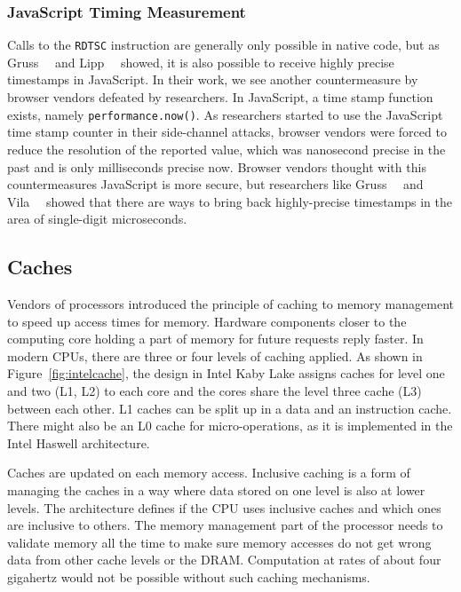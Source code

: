 \subsubsection{JavaScript Timing Measurement}

Calls to the \texttt{RDTSC} instruction are generally only possible in native
code, but as Gruss~\etal~\cite{memdedupjs} and Lipp~\etal~\cite{keytimejs}
showed, it is also possible to receive highly precise timestamps in JavaScript.
In their work, we see another countermeasure by browser vendors defeated by
researchers. In JavaScript, a time stamp function exists, namely
\texttt{performance.now()}. As researchers started to use the JavaScript time
stamp counter in their side-channel attacks, browser vendors were forced to
reduce the resolution of the reported value, which was nanosecond precise in the
past and is only milliseconds precise now. Browser vendors thought with this
countermeasures JavaScript is more secure, but researchers like
Gruss~\etal~\cite{memdedupjs} and Vila~\etal~\cite{loophole} showed that there
are ways to bring back highly-precise timestamps in the area of single-digit
microseconds.

\subsection{Caches}

Vendors of processors introduced the principle of caching to memory management
to speed up access times for memory. Hardware components closer to the computing
core holding a part of memory for future requests reply faster. In modern CPUs,
there are three or four levels of caching applied. As shown in
Figure~\ref{fig:intelcache}, the design in Intel Kaby Lake assigns caches for
level one and two (L1, L2) to each core and the cores share the level three
cache (L3) between each other. L1 caches can be split up in a data and an
instruction cache. There might also be an L0 cache for micro-operations, as it
is implemented in the Intel Haswell architecture.

Caches are updated on each memory access. Inclusive caching is a form of
managing the caches in a way where data stored on one level is also at lower
levels. The architecture defines if the CPU uses inclusive caches and which ones
are inclusive to others. The memory management part of the processor needs to
validate memory all the time to make sure memory accesses do not get wrong data
from other cache levels or the DRAM. Computation at rates of about four
gigahertz would not be possible without such caching mechanisms.

